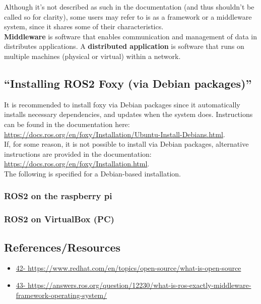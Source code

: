 \documentclass[a4paper, 10pt]{article}
\begin{document}
        Although it’s not described as such in the documentation (and thus shouldn’t be called so for clarity), some users may refer to is as a framework or a middleware system, since it shares some of their characteristics.\\ 
        \textbf{Middleware} is software that enables communication and management of data in distributes applications. A \textbf{distributed application} is software that runs on multiple machines (physical or virtual) within a network. 


        \subsection{``Installing ROS2 Foxy (via Debian packages)''}
        It is recommended to install foxy via Debian packages since it automatically installs necessary dependencies, and updates when the system does. Instructions can be found in the documentation here: \\ \url{https://docs.ros.org/en/foxy/Installation/Ubuntu-Install-Debians.html}. \\

        If, for some reason, it is not possible to install via Debian packages, alternative instructions are provided in the documentation: \\ \url{https://docs.ros.org/en/foxy/Installation.html}.\\ 
        
        The following is specified for a Debian-based installation. \\
		\subsubsection{ROS2 on the raspberry pi}

		\subsubsection{ROS2 on VirtualBox (PC)}

    \subsection{References/Resources}
        \begin{itemize}
            \item \url{42-	https://www.redhat.com/en/topics/open-source/what-is-open-source}
            \item \url{43-	https://answers.ros.org/question/12230/what-is-ros-exactly-middleware-framework-operating-system/ }
        \end{itemize}
	
\end{document}
